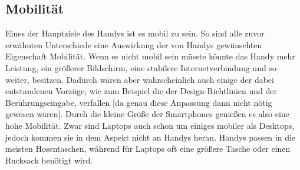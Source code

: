 \subsection{Mobilität}\myCheckmark
Eines der Hauptziele des Handys ist es mobil zu sein. %
	So sind alle zuvor erwähnten Unterschiede eine Auswirkung der von Handys gewünschten Eigenschaft Mobilität. %
		Wenn es nicht mobil sein müsste könnte das Handy mehr Leistung, ein größerer Bildschirm, eine stabilere Internetverbindung und so weiter, besitzen. Dadurch wären aber wahrscheinlich auch einige der dabei entstandenen Vorzüge, wie zum Beispiel die der Design-Richtlinien und der Berührungseingabe, verfallen [da genau diese Anpassung dann nicht nötig gewesen wären]. \newline%
Durch die kleine Größe der Smartphones genießen es also eine hohe Mobilität. Zwar sind Laptops auch schon um einiges mobiler als Desktops, jedoch kommen sie in dem Aspekt nicht an Handys heran. Handys passen in die meisten Hosentaschen, während für Laptops oft eine größere Tasche oder einen Rucksack benötigt wird.%






